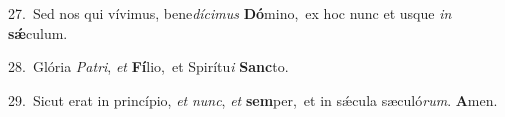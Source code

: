 {\numbfont\textcolor{\numbcolor}{27.}}~Sed nos qui vívimus, bene\-\textit{dí}\-\textit{ci}\textit{mus} \textbf{Dó}\-mino,~\star ex hoc nunc et usque \textit{in} \textbf{sǽ}\-culum.\par
{\numbfont\textcolor{\numbcolor}{28.}}~Glória \textit{Pa}\-\textit{tri}, \textit{et} \textbf{Fí}\-lio,~\star et Spirítu\textit{i} \textbf{Sanc}\-to.\par
{\numbfont\textcolor{\numbcolor}{29.}}~Sicut erat in princípio, \textit{et} \textit{nunc}\-, \textit{et} \textbf{sem}\-per,~\star et in sǽcula sæculó\-\textit{rum}\-. \textbf{A}\-men.\par
